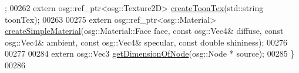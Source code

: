 \begin{DoxyCode}
      ;
00262     \textcolor{keyword}{extern} osg::ref\_ptr<osg::Texture2D> \hyperlink{namespacebrtr_aea7b3b188858f0bce09f2450a749f497}{createToonTex}(std::string toonTex);
00263 
00275     \textcolor{keyword}{extern} osg::ref\_ptr<osg::Material> \hyperlink{namespacebrtr_a7b54dcabf5846ea963221e59b38b0a79}{createSimpleMaterial}(osg::Material::Face face, \textcolor{keyword}{
      const} osg::Vec4& diffuse, \textcolor{keyword}{const} osg::Vec4& ambient, \textcolor{keyword}{const} osg::Vec4& specular, \textcolor{keyword}{const} \textcolor{keywordtype}{double} shininess);
00276     
00277     
00284     \textcolor{keyword}{extern} osg::Vec3 \hyperlink{namespacebrtr_a24ba7c5d07ad50afb09990116dd3556d}{getDimensionOfNode}(osg::Node * source);
00285 \}
00286 
\end{DoxyCode}

